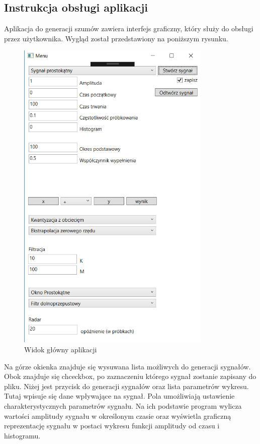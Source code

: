 \documentclass[12pt]{article}
\begin{document}
\subsection{Instrukcja obsługi aplikacji}
Aplikacja do generacji szumów zawiera interfejs graficzny, który służy do obsługi przez użytkownika. Wygląd został przedstawiony na poniższym rysunku.
\begin{figure}[h!]
 \centering
 \includegraphics[width=9.3cm]{ui1.PNG}
 \vspace{-0.3cm}
 \caption{Widok główny aplikacji}
 \label{Widok_aplikacjis}
\end{figure}

Na górze okienka znajduje się wysuwana lista możliwych do generacji sygnałów. Obok znajduje się chceckbox, po zaznaczeniu którego sygnał zostanie zapisany do pliku.
Niżej jest przycisk do generacji sygnałów oraz lista parametrów wykresu. Tutaj wpisuje się dane wpływające na sygnał.
Pola umożliwiają ustawienie charakterystycznych parametrów sygnału. Na ich podstawie program wylicza wartości amplitudy sygnału w określonym czasie oraz wyświetla graficzną reprezentację sygnału w postaci wykresu funkcji amplitudy od czasu i histogramu.\\
\end{document}
